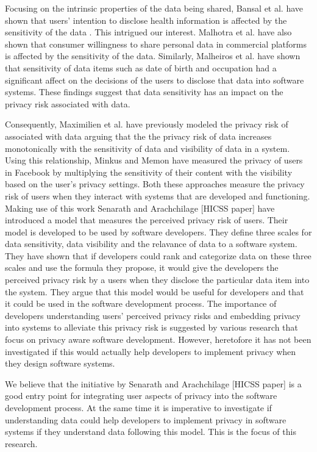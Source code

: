 \documentclass{sigchi}
\begin{document}
Focusing on the intrinsic properties of the data being shared, Bansal et al. have shown that users' intention to disclose health information is affected by the sensitivity of the data \cite {bansal2010impact}. This intrigued our interest. Malhotra et al. \cite {malhotra2004internet} have also shown that consumer willingness to share personal data in commercial platforms is affected by the sensitivity of the data. Similarly, Malheiros et al. \cite {malheiros2013fairly} have shown that sensitivity of data items such as date of birth and occupation had a significant affect on the decisions of the users to disclose that data into software systems. These findings suggest that data sensitivity has an impact on the privacy risk associated with data.

Consequently, Maximilien et al. \cite {maximilien2009privacy} have previously modeled the privacy risk of associated with data arguing that the the privacy risk of data increases monotonically with the sensitivity of data and visibility of data in a system. Using this relationship, Minkus and Memon \cite {minkus2014scale} have measured the privacy of users in Facebook by multiplying the sensitivity of their content with the visibility based on the user's privacy settings. Both these approaches measure the privacy risk of users when they interact with systems that are developed and functioning. Making use of this work Senarath and Arachchilage [HICSS paper] have introduced a model that measures the perceived privacy risk of users. Their model is developed to be used by software developers. They define three scales for data sensitivity, data visibility and the relavance of data to a software system. They have shown that if developers could rank and categorize data on these three scales and use the formula they propose, it would give the developers the perceived privacy risk by a users when they disclose the particular data item into the system. They argue that this model would be useful for developers and that it could be used in the software development process. The importance of developers understanding users' perceived privacy risks and embedding privacy into systems to alleviate this privacy risk is suggested by various research that focus on privacy aware software development. However, heretofore it has not been investigated if this would actually help developers to implement privacy when they design software systems.

We believe that the initiative by Senarath and Arachchilage [HICSS paper] is a good entry point for integrating user aspects of privacy into the software development process. At the same time it is imperative to investigate if understanding data could help developers to implement privacy in software systems if they understand data following this model. This is the focus of this research.
\end{document}
